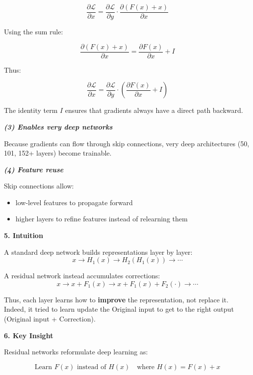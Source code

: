 \documentclass[12pt]{report}
\begin{document}
\[
\frac{\partial \mathcal{L}}{\partial x}
=
\frac{\partial \mathcal{L}}{\partial y}
\cdot
\frac{\partial (F(x) + x)}{\partial x}
\]

Using the sum rule:

\[
\frac{\partial (F(x) + x)}{\partial x}
=
\frac{\partial F(x)}{\partial x} + I
\]

Thus:

\[
\frac{\partial \mathcal{L}}{\partial x}
=
\frac{\partial \mathcal{L}}{\partial y}
\cdot
\left(
\frac{\partial F(x)}{\partial x} + I
\right)
\]

The identity term $I$ ensures that gradients always have a direct path backward.


\textbf{\textit{(3) Enables very deep networks}}

Because gradients can flow through skip connections, very deep architectures (50, 101, 152+ layers) become trainable.


\textbf{\textit{(4) Feature reuse}}

Skip connections allow:
\begin{itemize}
	\item low-level features to propagate forward
	\item higher layers to refine features instead of relearning them
\end{itemize}


\textbf{5. Intuition}

A standard deep network builds representations layer by layer:
\[
x \rightarrow H_1(x) \rightarrow H_2(H_1(x)) \rightarrow \cdots
\]

A residual network instead accumulates corrections:
\[
x \rightarrow x + F_1(x) \rightarrow x + F_1(x) + F_2(\cdot) \rightarrow \cdots
\]

Thus, each layer learns how to \textbf{improve} the representation, not replace it. Indeed, it tried to learn update the Original input to get to the right output (Original input + Correction).


\textbf{6. Key Insight}

Residual networks reformulate deep learning as:

\[
\text{Learn } F(x) \text{ instead of } H(x)
\quad \text{where } H(x) = F(x) + x
\]
\end{document}
